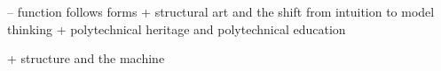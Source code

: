 -- function follows forms
  + structural art and the shift from intuition to model thinking
  + polytechnical heritage and polytechnical education

  + structure and the machine

